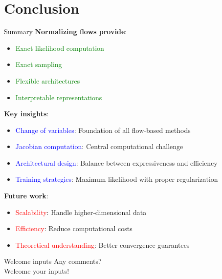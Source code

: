 \documentclass[aspectratio=169]{beamer}
\begin{document}
\section{Conclusion}

\begin{frame}{Summary}
\textbf{Normalizing flows provide}:
\begin{itemize}
    \item \textcolor{green}{Exact likelihood computation}
    \item \textcolor{green}{Exact sampling}
    \item \textcolor{green}{Flexible architectures}
    \item \textcolor{green}{Interpretable representations}
\end{itemize}

\textbf{Key insights}:
\begin{itemize}
    \item \textcolor{blue}{Change of variables}: Foundation of all flow-based methods
    \item \textcolor{blue}{Jacobian computation}: Central computational challenge
    \item \textcolor{blue}{Architectural design}: Balance between expressiveness and efficiency
    \item \textcolor{blue}{Training strategies}: Maximum likelihood with proper regularization
\end{itemize}

\textbf{Future work}:
\begin{itemize}
    \item \textcolor{red}{Scalability}: Handle higher-dimensional data
    \item \textcolor{red}{Efficiency}: Reduce computational costs
    \item \textcolor{red}{Theoretical understanding}: Better convergence guarantees
\end{itemize}
\end{frame}

\begin{frame}{Welcome inputs}  
  \centering  
  Any comments?
  \\[2em]
  Welcome your inputs!  
\end{frame}  
  
\end{document}
